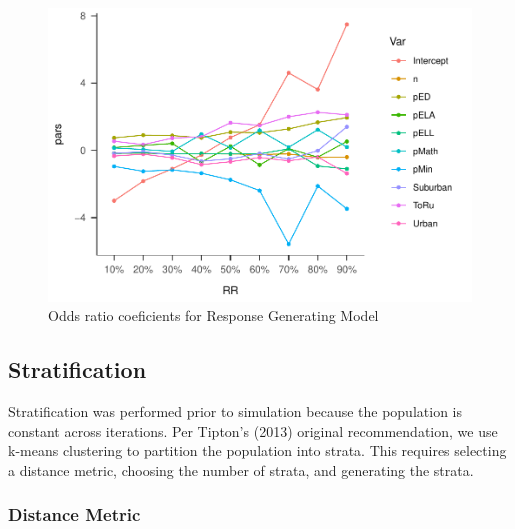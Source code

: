 \documentclass[man,floatsintext]{apa6}
\begin{document}
\begin{figure}
\centering
\includegraphics{GenSamp_Paper_files/figure-latex/fig-RGM-Pars-1.pdf}
\caption{\label{fig:fig-RGM-Pars}Odds ratio coeficients for Response Generating Model}
\end{figure}

\hypertarget{stratification}{%
\subsection{Stratification}\label{stratification}}

Stratification was performed prior to simulation because the population is constant across iterations. Per Tipton's (2013) original recommendation, we use k-means clustering to partition the population into strata. This requires selecting a distance metric, choosing the number of strata, and generating the strata.

\hypertarget{distance-metric-1}{%
\subsubsection{Distance Metric}\label{distance-metric-1}}
\end{document}
